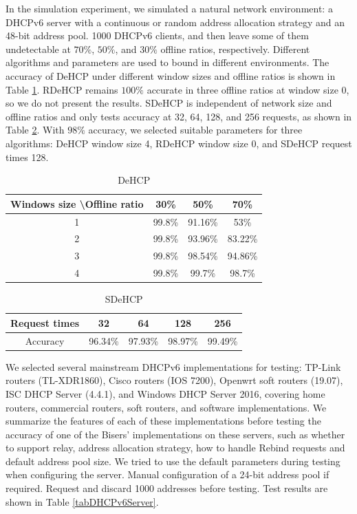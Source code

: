 \documentclass[conference]{IEEEtran}
\begin{document}
In the simulation experiment, we simulated a natural network
environment: a DHCPv6 server with a continuous or random address
allocation strategy and an 48-bit address pool. 1000 DHCPv6 clients,
and then leave some of them undetectable at $70\%$, $50\%$, and $30\%$
offline ratios, respectively. Different algorithms and parameters are
used to bound in different environments. The accuracy of DeHCP under
different window sizes and offline ratios is shown in Table
\ref{tabDeHCP}. RDeHCP remains $100\%$ accurate in three offline
ratios at window size 0, so we do not present the results. SDeHCP is
independent of network size and offline ratios and only tests accuracy
at 32, 64, 128, and 256 requests, as shown in Table
\ref{tabSDeHCP}. With $98\%$ accuracy, we selected suitable parameters
for three algorithms: DeHCP window size 4, RDeHCP window size 0, and
SDeHCP request times 128.

\begin{table}[htbp]
  \caption{DeHCP}
  \label{tabDeHCP}
  \centering
  \begin{tabular}{|c|c|c|c|}
    \hline
    Windows size \textbackslash Offline ratio & 30\% & 50\% & 70\% \\
    \hline
    1 & 99.8\% & 91.16\% & 53\% \\
    2 & 99.8\% & 93.96\% & 83.22\% \\
    3 & 99.8\% & 98.54\% & 94.86\% \\
    4 & 99.8\% & 99.7\% & 98.7\% \\
    \hline
  \end{tabular}
\end{table}

\begin{table}[htbp]
  \caption{SDeHCP}
  \label{tabSDeHCP}
  \centering
  \begin{tabular}{|c|c|c|c|c|}
    \hline
    Request times & 32 & 64 & 128 & 256 \\
    \hline
    Accuracy & 96.34\% & 97.93\% & 98.97\% & 99.49\% \\
    \hline
  \end{tabular}
\end{table}

We selected several mainstream DHCPv6 implementations for testing:
TP-Link routers (TL-XDR1860), Cisco routers (IOS 7200), Openwrt soft
routers (19.07), ISC DHCP Server (4.4.1), and Windows DHCP Server
2016, covering home routers, commercial routers, soft routers, and
software implementations. We summarize the features of each of these
implementations before testing the accuracy of one of the Bisers'
implementations on these servers, such as whether to support relay,
address allocation strategy, how to handle Rebind requests and default
address pool size. We tried to use the default parameters during
testing when configuring the server. Manual configuration of a 24-bit
address pool if required. Request and discard 1000 addresses before
testing. Test results are shown in Table \ref{tabDHCPv6Server}.
\end{document}
